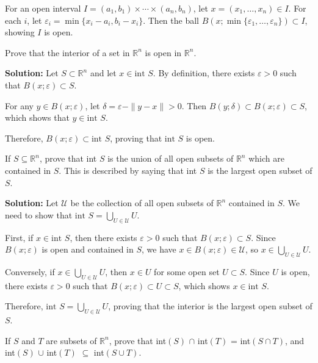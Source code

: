 For an open interval $I = (a_1,b_1) \times \cdots \times (a_n,b_n)$, let $x = (x_1,\ldots,x_n) \in I$. For each $i$, let $\varepsilon_i = \min\{x_i - a_i, b_i - x_i\}$. Then the ball $B(x;\min\{\varepsilon_1,\ldots,\varepsilon_n\}) \subset I$, showing $I$ is open.

\begin{problembox}
Prove that the interior of a set in $\mathbb{R}^n$ is open in $\mathbb{R}^n$.
\end{problembox}

\textbf{Solution:} Let $S \subset \mathbb{R}^n$ and let $x \in \text{int } S$. By definition, there exists $\varepsilon > 0$ such that $B(x;\varepsilon) \subset S$.

For any $y \in B(x;\varepsilon)$, let $\delta = \varepsilon - \|y-x\| > 0$. Then $B(y;\delta) \subset B(x;\varepsilon) \subset S$, which shows that $y \in \text{int } S$.

Therefore, $B(x;\varepsilon) \subset \text{int } S$, proving that $\text{int } S$ is open.

\begin{problembox}
If $S \subseteq \mathbb{R}^n$, prove that int $S$ is the union of all open subsets of $\mathbb{R}^n$ which are contained in $S$. This is described by saying that int $S$ is the largest open subset of $S$.
\end{problembox}

\textbf{Solution:} Let $\mathcal{U}$ be the collection of all open subsets of $\mathbb{R}^n$ contained in $S$. We need to show that $\text{int } S = \bigcup_{U \in \mathcal{U}} U$.

First, if $x \in \text{int } S$, then there exists $\varepsilon > 0$ such that $B(x;\varepsilon) \subset S$. Since $B(x;\varepsilon)$ is open and contained in $S$, we have $x \in B(x;\varepsilon) \in \mathcal{U}$, so $x \in \bigcup_{U \in \mathcal{U}} U$.

Conversely, if $x \in \bigcup_{U \in \mathcal{U}} U$, then $x \in U$ for some open set $U \subset S$. Since $U$ is open, there exists $\varepsilon > 0$ such that $B(x;\varepsilon) \subset U \subset S$, which shows $x \in \text{int } S$.

Therefore, $\text{int } S = \bigcup_{U \in \mathcal{U}} U$, proving that the interior is the largest open subset of $S$.

\begin{problembox}
If $S$ and $T$ are subsets of $\mathbb{R}^n$, prove that
int$(S)$ $\cap$ int$(T)$ = int$(S \cap T)$,
and int$(S)$ $\cup$ int$(T)$ $\subseteq$ int$(S \cup T)$.
\end{problembox}    

